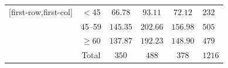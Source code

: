 \documentclass[oneside]{book}\usepackage[]{graphicx}\usepackage[svgnames]{xcolor}
\begin{document}
\begin{itemize}
\begin{table}[H]
\begin{NiceTabular}{c|ccc|c}[first-row,first-col]
                         & $<$45     & $ 66.78 $                                         & $ 93.11 $    & $ 72.12 $  & $ 232 $  \\
                        & 45--59    & $ 145.35 $                                        & $ 202.66 $   & $ 156.98 $ & $ 505 $  \\
                        & $ \ge $60 & $ 137.87 $                                        & $ 192.23 $   & $ 148.90 $ & $ 479 $  \\
                        \midrule
                        & Total     & $ 350 $                                           & $ 488 $      & $ 378 $    & $ 1216 $
                  \end{NiceTabular}
            \end{table}
\end{itemize}
\end{document}
